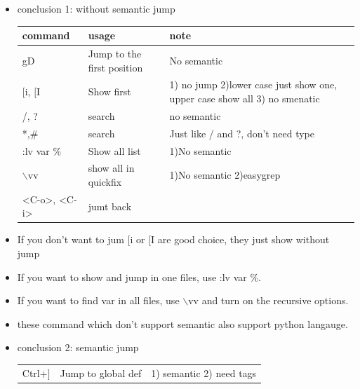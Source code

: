 \documentclass[a4paper,12pt,twoside]{book}
\begin{document}
\begin{itemize}
		\item conclusion 1: without semantic jump
\begin{center}
		\begin{tabular}{p{}|p{}|p{}}
		\hline
		command & usage & note\\

   	    \hline 
		gD & Jump to the first position & No semantic  \\
	
		\hline 
		$[$i, $[$I & Show first & 1) no jump 2)lower case just show one, upper case show all  3) no smenatic\\
	
		\hline 
		/, ? & search & no semantic  \\
		
		\hline 
		*,\# & search & Just like / and ?, don't need type  \\

		\hline 
		:lv var \% & Show all list & 1)No semantic  \\
		
		\hline 
		$\backslash$vv & show all in quickfix & 1)No semantic 2)easygrep\\

              \hline
	   <C-o>, <C-i> & jumt back &  \\


	\end{tabular}
	\end{center}
	
	\item If you don't want to jum $[$i or $[$I are good choice, they just show without jump

	\item If you want to show and jump in one files, use :lv var \%. 

	\item If you want to find var in all files, use $\backslash$vv and turn on the recursive options.  

	\item these command which don't support semantic also support python langauge. 

		\item conclusion 2: semantic jump
\begin{center}
		\begin{tabular}{p{}|p{}|p{}}
		\hline 
		Ctrl+$]$ &Jump to global def & 1) semantic 2) need tags \\


\end{tabular}
\end{center}
\end{itemize}
\end{document}
